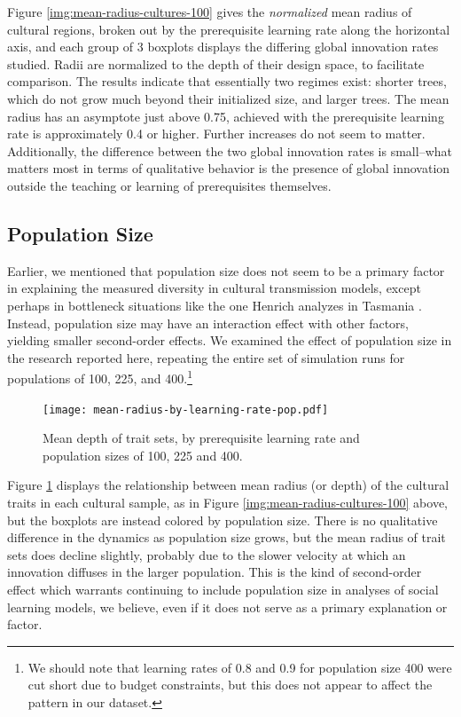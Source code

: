 \documentclass[graybox,natbib]{svmult}
\begin{document}
Figure \ref{img:mean-radius-cultures-100} gives the \emph{normalized}
mean radius of cultural regions, broken out by the prerequisite learning
rate along the horizontal axis, and each group of 3 boxplots displays
the differing global innovation rates studied. Radii are normalized to
the depth of their design space, to facilitate comparison. The results
indicate that essentially two regimes exist: shorter trees, which do not
grow much beyond their initialized size, and larger trees. The mean
radius has an asymptote just above 0.75, achieved with the prerequisite
learning rate is approximately 0.4 or higher. Further increases do not
seem to matter. Additionally, the difference between the two global
innovation rates is small--what matters most in terms of qualitative
behavior is the presence of global innovation outside the teaching or
learning of prerequisites themselves.

\subsection{Population Size}\label{population-size}

Earlier, we mentioned that population size does not seem to be a primary
factor in explaining the measured diversity in cultural transmission
models, except perhaps in bottleneck situations like the one Henrich
analyzes in Tasmania \citeyearpar{henrich2004}. Instead, population size
may have an interaction effect with other factors, yielding smaller
second-order effects. We examined the effect of population size in the
research reported here, repeating the entire set of simulation runs for
populations of 100, 225, and 400.\footnote{We should note that learning
  rates of 0.8 and 0.9 for population size 400 were cut short due to
  budget constraints, but this does not appear to affect the pattern in
  our dataset.}

\begin{figure}[h] 
\centering 
\texttt{[image: mean-radius-by-learning-rate-pop.pdf]} 
\caption{Mean depth of trait sets, by prerequisite learning rate and population sizes of 100, 225 and 400.} 
\label{img:mean-radius-cultures-pop} 
\end{figure}

Figure \ref{img:mean-radius-cultures-pop} displays the relationship
between mean radius (or depth) of the cultural traits in each cultural
sample, as in Figure \ref{img:mean-radius-cultures-100} above, but the
boxplots are instead colored by population size. There is no qualitative
difference in the dynamics as population size grows, but the mean radius
of trait sets does decline slightly, probably due to the slower velocity
at which an innovation diffuses in the larger population. This is the
kind of second-order effect which warrants continuing to include
population size in analyses of social learning models, we believe, even
if it does not serve as a primary explanation or factor.
\end{document}
